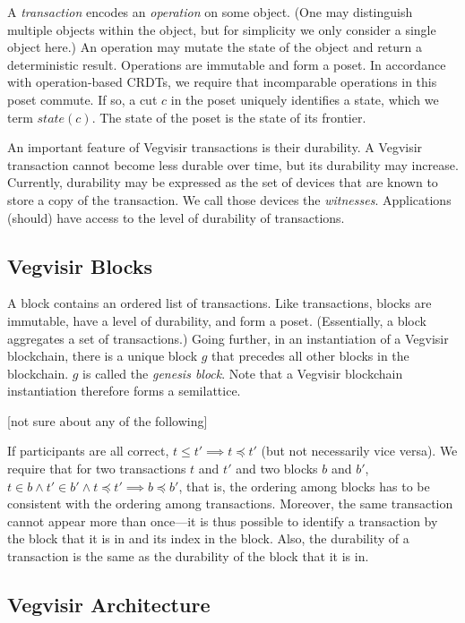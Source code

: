 \documentclass{article}
\begin{document}
A \emph{transaction} encodes an \emph{operation} on some object.
(One may distinguish multiple objects within the object, but for simplicity
we only consider a single object here.)
An operation may mutate the state of the object and return a deterministic
result.
Operations are immutable and form a poset.
In accordance with operation-based CRDTs, we require that incomparable
operations in this poset commute.
If so, a cut $c$ in the poset uniquely identifies a state, which we term
$\mathit{state}(c)$.
The state of the poset is the state of its frontier.

An important feature of Vegvisir transactions is their durability.
A Vegvisir transaction cannot become less durable over time, but its
durability may increase.  Currently, durability may be expressed as the
set of devices that are known to store a copy of the transaction.  We
call those devices the \emph{witnesses}.
Applications (should) have access to the level of durability of
transactions.

\subsection{Vegvisir Blocks}

A block contains an ordered list of transactions.
Like transactions, blocks are immutable, have a level of durability,
and form a poset.
(Essentially, a block aggregates a set of transactions.)
Going further, in an instantiation of a Vegvisir blockchain,
there is a unique block $g$ that precedes all other blocks in the blockchain.
$g$ is called the \emph{genesis block}.  Note that a Vegvisir blockchain
instantiation therefore forms a semilattice.

[not sure about any of the following]

If participants are all correct, $t \leq t' \implies t \preceq t'$
(but not necessarily vice versa).
We require that for two transactions $t$ and $t'$ and two blocks $b$ and
$b'$, $t \in b \wedge t' \in b' \wedge t \preceq t' \implies b \preceq b'$,
that is, the ordering among blocks has to be consistent with the ordering
among transactions.  Moreover, the same transaction cannot appear more
than once---it is thus possible to identify a transaction by the block
that it is in and its index in the block.
Also, the durability of a
transaction is the same as the durability of the block that it is in.

\subsection{Vegvisir Architecture}
\end{document}
